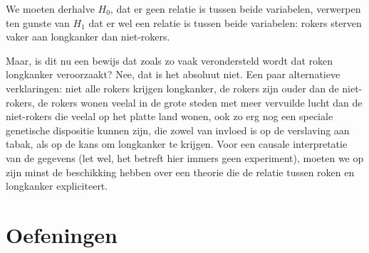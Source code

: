 We moeten derhalve $H_{0}$, dat er geen relatie is tussen beide variabelen, verwerpen ten gunste van $H_{1}$ dat er wel een relatie is tussen beide variabelen: rokers sterven vaker aan longkanker dan niet-rokers.

Maar, is dit nu een bewijs dat zoals zo vaak verondersteld wordt dat roken longkanker veroorzaakt? Nee, dat is het absoluut niet. Een paar alternatieve verklaringen: niet alle rokers krijgen longkanker, de rokers zijn ouder dan de niet-rokers, de rokers wonen veelal in de grote steden met
meer vervuilde lucht dan de niet-rokers die veelal op het platte land wonen, ook zo erg nog een speciale genetische dispositie kunnen zijn, die zowel van invloed is op de verslaving aan tabak, als op de kans om longkanker te krijgen. Voor een causale interpretatie van de gegevens (let wel, het betreft hier immers geen experiment), moeten we op zijn minst de beschikking hebben over een theorie die de relatie tussen roken en longkanker expliciteert.

\section{Oefeningen}
\label{sec:chi-kwadraat-oefeningen}

